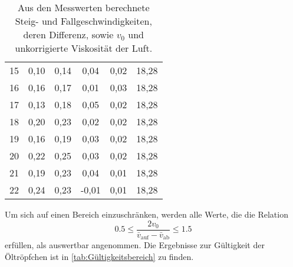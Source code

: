 \begin{table}[!ht]
\begin{tabular}{c c c c c c}
         15&   0,10 &                  0,14 &                      0,04 &  0,02 &          18,28  \\
         16&  0,16 &                  0,17 &                      0,01 &  0,03 &          18,28  \\
         17&   0,13 &                  0,18 &                      0,05 &  0,02 &          18,28  \\
         18&   0,20 &                  0,23 &                      0,02 &  0,02 &          18,28  \\
         19&   0,16 &                  0,19 &                      0,03 &  0,02 &          18,28  \\
         20&   0,22 &                  0,25 &                      0,03 &  0,02 &          18,28  \\
         21&   0,19 &                  0,23 &                      0,04 &  0,01 &          18,28  \\
         22&   0,24 &                  0,23 &                     -0,01 &  0,01 &          18,28  \\
        \bottomrule
    \end{tabular}
    \caption{Aus den Messwerten berechnete Steig- und Fallgeschwindigkeiten, deren Differenz, 
	sowie $v_0$ und unkorrigierte Viskosität der Luft.}
    \label{tab:Tabelle2}
\end{table}

Um sich auf einen Bereich einzuschränken, werden alle Werte, die die Relation 
\begin{equation*}
    0.5\leq \frac{2v_0}{\bar{v}_{\text{auf}}-\bar{v}_{\text{ab}}}\leq 1.5
\end{equation*}
erfüllen, als auswertbar angenommen. Die Ergebnisse zur Gültigkeit der Öltröpfchen ist in \autoref{tab:Gültigkeitsbereich} 
zu finden.

